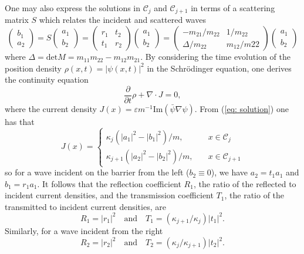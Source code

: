 \documentclass[12pt]{article}       %
\begin{document}
One may also express the solutions in $\mathcal{C}_j$ and $\mathcal{C}_{j+1}$ in terms of a scattering matrix $S$ which relates the incident and scattered waves
\begin{equation}\label{eq: scattered matrix}
        \left(\begin{matrix}
        b_1 \\
        a_2
    \end{matrix}\right)
    = S
    \left(\begin{matrix}
        a_1 \\
        b_2
    \end{matrix}\right)
    = \left(
    \begin{matrix}
        r_1 & t_2 \\
        t_1 & r_2
    \end{matrix}\right)
    \left(\begin{matrix}
        a_1 \\
        b_2
    \end{matrix}\right)
    = \left(
    \begin{matrix}
        -m_{21}/m_{22} & 1/m_{22} \\
        \Delta /m_{22} & m_{12}/m{22}
    \end{matrix}\right)
    \left(\begin{matrix}
        a_1 \\
        b_2
    \end{matrix}\right)
\end{equation}
where $\Delta = \mathrm{det} M = m_{11}m_{22}-m_{12}m_{21}$. By considering the time evolution of the position density $\rho(x, t) = |\psi(x, t)|^2$ in the Schr\"odinger equation, one derives the continuity equation
\begin{equation}
    \frac{\partial}{\partial t}\rho + \nabla\cdot J = 0,
\end{equation}
where the current density $J(x)=\varepsilon m^{-1}\mathrm{Im}(\bar{\psi}\nabla\psi)$. From (\ref{eq: solution}) one has that
\begin{equation}
    J(x) = 
    \begin{cases}
        \kappa_j(|a_1|^2 - |b_1|^2)/m, \quad &x\in\mathcal{C}_j \\
        \kappa_{j+1}(|a_2|^2 - |b_2|^2)/m, \quad &x\in\mathcal{C}_{j+1}         
    \end{cases}
\end{equation}
so for a wave incident on the barrier from the left ($b_2 \equiv 0$), we have $a_2 = t_1 a_1$ and $b_1 = r_1 a_1$. It follows that the reflection coefficient $R_1$, the ratio of the reflected to incident current densities, and the transmission coefficient $T_1$, the ratio of the transmitted to incident current densities, are
\begin{equation}\label{eq: coefficients1}
    R_1 = |r_1|^2 \quad \mathrm{and}\quad T_1 = (\kappa_{j+1}/\kappa_j)|t_1|^2.
\end{equation}
Similarly, for a wave incident from the right
\begin{equation}\label{eq: coefficients2}
    R_2 = |r_2|^2 \quad \mathrm{and}\quad T_2 = (\kappa_{j}/\kappa_{j+1})|t_2|^2.
\end{equation}
\end{document}
